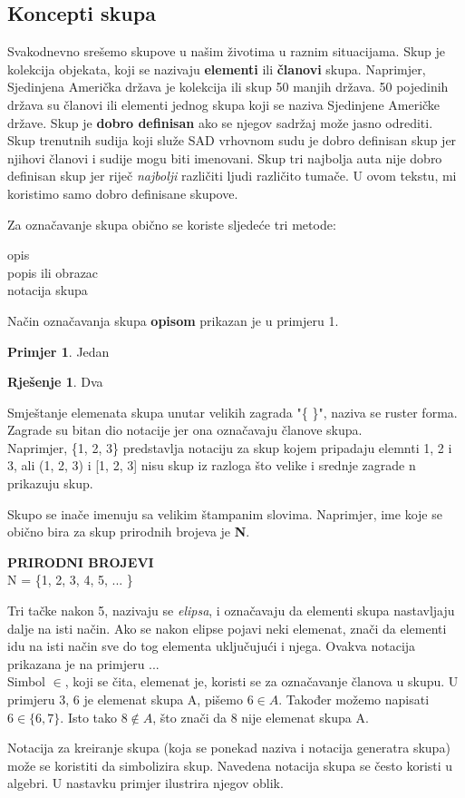 \documentclass[a4paper, 14pt]{article}
\theoremstyle{definition}
\newtheorem{example}{Primjer}
\newtheorem*{solution*}{Rješenje}
\begin{document}
\newpage
\subsection{Koncepti skupa}

Svakodnevno srešemo skupove u našim životima u raznim situacijama. Skup je kolekcija objekata, koji se nazivaju \textbf{elementi} ili \textbf{članovi} skupa. Naprimjer, Sjedinjena Američka država je kolekcija ili skup 50 manjih država. 50 pojedinih država su članovi ili elementi jednog skupa koji se naziva Sjedinjene Američke države.
Skup je \textbf{dobro definisan} ako se njegov sadržaj može jasno odrediti. Skup trenutnih sudija koji služe SAD vrhovnom sudu je dobro definisan skup jer njihovi članovi i sudije mogu biti imenovani. Skup tri najbolja auta nije dobro definisan skup jer riječ \textit{najbolji} različiti ljudi različito tumače. U ovom tekstu, mi koristimo samo dobro definisane skupove.

Za označavanje skupa obično se koriste sljedeće tri metode:
\begin{center}
opis\\
popis ili obrazac\\
notacija skupa
\end{center}
Način označavanja skupa \textbf{opisom} prikazan je u primjeru 1.\\
\begin{example}
Jedan
\end{example}
\begin{solution*}
Dva
\end{solution*}

Smještanje elemenata skupa unutar velikih zagrada "\{ \}", naziva se ruster forma. Zagrade su bitan dio notacije jer ona označavaju članove skupa.\\
Naprimjer, \{1, 2, 3\} predstavlja notaciju za skup kojem pripadaju elemnti 1, 2 i 3, ali (1, 2, 3) i [1, 2, 3] nisu skup iz razloga što velike i srednje zagrade n prikazuju skup.

Skupo se inače imenuju sa velikim štampanim slovima. Naprimjer, ime koje se obično bira za skup prirodnih brojeva je \textbf{N}.\\
\begin{center}
\textbf{\textsc{PRIRODNI BROJEVI}}\\
N = \{1, 2, 3, 4, 5, ... \}
\end{center}
Tri tačke nakon 5, nazivaju se \textit{elipsa}, i označavaju da elementi skupa nastavljaju dalje na isti način. Ako se nakon elipse pojavi neki elemenat, znači da elementi idu na isti način sve do tog elementa uključujući i njega. Ovakva notacija prikazana je na primjeru ...\\


Simbol \textbf{$\in$}, koji se čita, elemenat je, koristi se za označavanje članova u skupu. U primjeru 3, 6 je elemenat skupa A, pišemo $6\in A$. Također možemo napisati $6\in \{6, 7\}$. Isto tako $8\notin A$, što znači da 8 nije elemenat skupa A.

Notacija za kreiranje skupa (koja se ponekad naziva i notacija generatra skupa) može se koristiti da simbolizira skup. Navedena notacija skupa se često koristi u algebri. U nastavku primjer ilustrira njegov oblik.
\end{document}
